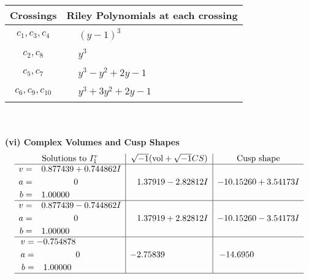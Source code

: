 \documentclass[1p]{elsarticle_modified}
\theoremstyle{definition}
\newcommand{\I}{\sqrt{-1}}
\begin{document}
\begin{tabular}{m{50pt}|m{274pt}}
Crossings & \hspace{64pt}Riley Polynomials at each crossing \\
\hline $$\begin{aligned}c_{1},c_{3},c_{4}\end{aligned}$$&$\begin{aligned}
&(y-1)^3
\end{aligned}$\\
\hline $$\begin{aligned}c_{2},c_{8}\end{aligned}$$&$\begin{aligned}
&y^3
\end{aligned}$\\
\hline $$\begin{aligned}c_{5},c_{7}\end{aligned}$$&$\begin{aligned}
&y^3- y^2+2 y-1
\end{aligned}$\\
\hline $$\begin{aligned}c_{6},c_{9},c_{10}\end{aligned}$$&$\begin{aligned}
&y^3+3 y^2+2 y-1
\end{aligned}$\\
\hline
\end{tabular}\\~\\
\newpage\flushleft \textbf{(vi) Complex Volumes and Cusp Shapes}
$$\begin{array}{c|c|c}  
\text{Solutions to }I^v_{1}& \I (\text{vol} + \sqrt{-1}CS) & \text{Cusp shape}\\
 \hline 
\begin{aligned}
v &= \phantom{-}0.877439 + 0.744862 I \\
a &= \phantom{-0.000000 } 0 \\
b &= \phantom{-}1.00000\phantom{ +0.000000I}\end{aligned}
 & \phantom{-}1.37919 - 2.82812 I & -10.15260 + 3.54173 I \\ \hline\begin{aligned}
v &= \phantom{-}0.877439 - 0.744862 I \\
a &= \phantom{-0.000000 } 0 \\
b &= \phantom{-}1.00000\phantom{ +0.000000I}\end{aligned}
 & \phantom{-}1.37919 + 2.82812 I & -10.15260 - 3.54173 I \\ \hline\begin{aligned}
v &= -0.754878\phantom{ +0.000000I} \\
a &= \phantom{-0.000000 } 0 \\
b &= \phantom{-}1.00000\phantom{ +0.000000I}\end{aligned}
 & -2.75839\phantom{ +0.000000I} & -14.6950\phantom{ +0.000000I}\\
 \hline 
 \end{array}$$\newpage
\end{document}

